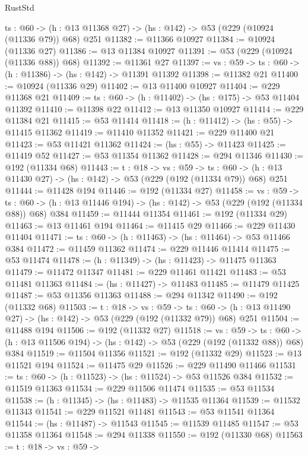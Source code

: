 \begin{lexlean}{RustStd}
\begin{coremodule}
  {ts : @60} -> (h : @13 @11368 @27) -> (hs : @142) -> @53 (@229 (@10924 (@11336 @79)) @68) @251
@11382 := @11366 @10927
@11384 := @10924 (@11336 @27)
@11386 := @13 @11384 @10927
@11391 := @53 (@229 (@10924 (@11336 @88)) @68)
@11392 := @11361 @27
@11397 := {vs : @59} -> {ts : @60} -> (h : @11386) -> (hs : @142) -> @11391 @11392
@11398 := @11382 @21
@11400 := @10924 (@11336 @29)
@11402 := @13 @11400 @10927
@11404 := @229 @11368 @21
@11409 := {ts : @60} -> (h : @11402) -> (hs : @175) -> @53 @11404 @11392
@11410 := @11398 @22
@11412 := @13 @11350 @10927
@11414 := @229 @11384 @21
@11415 := @53 @11414
@11418 := (h : @11412) -> (hs : @55) -> @11415 @11362
@11419 := @11410 @11352
@11421 := @229 @11400 @21
@11423 := @53 @11421 @11362
@11424 := (hs : @55) -> @11423
@11425 := @11419 @52
@11427 := @53 @11354 @11362
@11428 := @294 @11346
@11430 := @192 (@11334 @68)
@11443 := {t : @18} ->
  {vs : @59} ->
  {ts : @60} -> (h : @13 @11430 @27) -> (hs : @142) -> @53 (@229 (@192 (@11334 @79)) @68) @251
@11444 := @11428 @194
@11446 := @192 (@11334 @27)
@11458 := {vs : @59} ->
  {ts : @60} -> (h : @13 @11446 @194) -> (hs : @142) -> @53 (@229 (@192 (@11334 @88)) @68) @384
@11459 := @11444 @11354
@11461 := @192 (@11334 @29)
@11463 := @13 @11461 @194
@11464 := @11415 @29
@11466 := @229 @11430 @11404
@11471 := {ts : @60} -> (h : @11463) -> (hs : @11464) -> @53 @11466 @384
@11472 := @11459 @11362
@11474 := @229 @11446 @11414
@11475 := @53 @11474
@11478 := (h : @11349) -> (hs : @11423) -> @11475 @11363
@11479 := @11472 @11347
@11481 := @229 @11461 @11421
@11483 := @53 @11481 @11363
@11484 := (hs : @11427) -> @11483
@11485 := @11479 @11425
@11487 := @53 @11356 @11363
@11488 := @294 @11342
@11490 := @192 (@11332 @68)
@11503 := {t : @18} ->
  {vs : @59} ->
  {ts : @60} -> (h : @13 @11490 @27) -> (hs : @142) -> @53 (@229 (@192 (@11332 @79)) @68) @251
@11504 := @11488 @194
@11506 := @192 (@11332 @27)
@11518 := {vs : @59} ->
  {ts : @60} -> (h : @13 @11506 @194) -> (hs : @142) -> @53 (@229 (@192 (@11332 @88)) @68) @384
@11519 := @11504 @11356
@11521 := @192 (@11332 @29)
@11523 := @13 @11521 @194
@11524 := @11475 @29
@11526 := @229 @11490 @11466
@11531 := {ts : @60} -> (h : @11523) -> (hs : @11524) -> @53 @11526 @384
@11532 := @11519 @11363
@11534 := @229 @11506 @11474
@11535 := @53 @11534
@11538 := (h : @11345) -> (hs : @11483) -> @11535 @11364
@11539 := @11532 @11343
@11541 := @229 @11521 @11481
@11543 := @53 @11541 @11364
@11544 := (hs : @11487) -> @11543
@11545 := @11539 @11485
@11547 := @53 @11358 @11364
@11548 := @294 @11338
@11550 := @192 (@11330 @68)
@11563 := {t : @18} ->
  {vs : @59} ->

\end{coremodule}
\end{lexlean}
